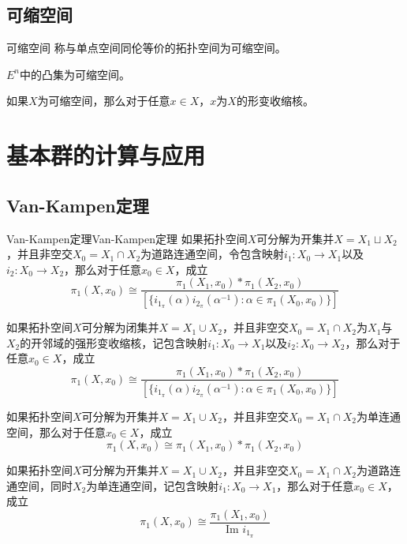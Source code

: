 \documentclass[lang = cn, scheme = chinese, thmcnt = section, usesamecnt]{elegantbook}
\begin{document}
\subsection{可缩空间}

\begin{definition}{可缩空间}
	称与单点空间同伦等价的拓扑空间为可缩空间。
\end{definition}

\begin{example}
	$E^n$中的凸集为可缩空间。
\end{example}

\begin{proposition}
	如果$X$为可缩空间，那么对于任意$x\in X$，$x$为$X$的形变收缩核。
\end{proposition}

\section{基本群的计算与应用}

\subsection{Van-Kampen定理}

\begin{theorem}{Van-Kampen定理}{Van-Kampen定理}
	如果拓扑空间$X$可分解为开集并$X=X_1\sqcup X_2$，并且非空交$X_0=X_1\cap X_2$为道路连通空间，令包含映射$i_1:X_0\to X_1$以及$i_2:X_0\to X_2$，那么对于任意$x_0\in X$，成立%
	$$
	\pi_1(X,x_0)\cong\frac{\pi_1(X_1,x_0)*\pi_1(X_2,x_0)}{[\{ i_{1_\pi}(\alpha)i_{2_\pi}(\alpha^{-1}):\alpha\in \pi_1(X_0,x_0) \}]}
	$$
\end{theorem}

\begin{corollary}
	如果拓扑空间$X$可分解为闭集并$X=X_1\cup X_2$，并且非空交$X_0=X_1\cap X_2$为$X_1$与$X_2$的开邻域的强形变收缩核，记包含映射$i_1:X_0\to X_1$以及$i_2:X_0\to X_2$，那么对于任意$x_0\in X$​，成立
	$$
	\pi_1(X,x_0)\cong\frac{\pi_1(X_1,x_0)*\pi_1(X_2,x_0)}{[\{ i_{1_\pi}(\alpha)i_{2_\pi}(\alpha^{-1}):\alpha\in \pi_1(X_0,x_0) \}]}
	$$
\end{corollary}

\begin{corollary}
	如果拓扑空间$X$可分解为开集并$X=X_1\cup X_2$，并且非空交$X_0=X_1\cap X_2$为单连通空间，那么对于任意$x_0\in X$​，成立
	$$
	\pi_1(X,x_0)\cong \pi_1(X_1,x_0)*\pi_1(X_2,x_0)
	$$
\end{corollary}

\begin{corollary}
	如果拓扑空间$X$可分解为开集并$X=X_1\cup X_2$，并且非空交$X_0=X_1\cap X_2$为道路连通空间，同时$X_2$为单连通空间，记包含映射$i_1:X_0\to X_1$，那么对于任意$x_0\in X$​，成立
	$$
	\pi_1(X,x_0)\cong\frac{\pi_1(X_1,x_0)}{\text{Im }i_{1_\pi}}
	$$
\end{corollary}
\end{document}

